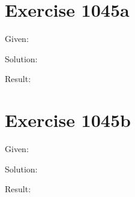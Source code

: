 \documentclass[a4paper, 10pt]{scrartcl}
\begin{document}
\section{Exercise 1045a}

Given:
\[
\]

Solution:

Result:

\section{Exercise 1045b}

Given:
\[
\]

Solution:

Result:
\end{document}
